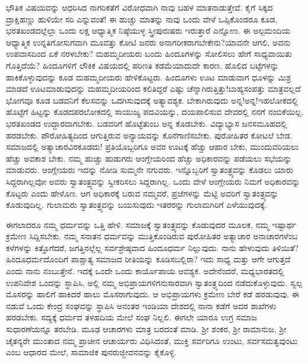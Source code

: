 ಭೌತಿಕ ವಿಷಯವನ್ನು ಆಧರಿಸಿದ ನಾಗರಿಕತೆಗೆ ವಿರೋಧವಾಗಿ ನಾವು ಬಹಳ ಮಾತನಾಡುತ್ತೇವೆ. ಕೈಗೆ ಸಿಕ್ಕದ ದ್ರಾಕ್ಷಿಹಣ್ಣು ಹುಳಿಯೇ ಸರಿ ಎನ್ನುವಂತೆ! ಈ ಹುಚ್ಚು ಮಾತನ್ನು ನಾವು ಒಂದು ವೇಳೆ ಒಪ್ಪಿಕೊಂಡರೂ ಕೂಡ, ಭರತಖಂಡದಲ್ಲೆಲ್ಲಾ ಒಂದು ಲಕ್ಷ ಆಧ್ಯಾತ್ಮಿಕ ನಿಷ್ಠೆಯುಳ್ಳ ಸ್ತ್ರೀ\enginline{-}ಪುರುಷರು ಇರುತ್ತಾರೆ ಎನ್ನೋಣ. ಈ ಅಲ್ಪಮಂದಿಯ ಆಧ್ಯಾತ್ಮಿಕ ಉನ್ನತಿಗೋಸುಗವಾಗಿ ಮೂವತ್ತು ಕೋಟಿ ಜನರು ಅನಾಗರೀಕರಾಗಬೇಕೇನು?ಯಾವನೇ ಆಗಲಿ, ಅವನು ಉಪವಾಸದಿಂದ ಏಕೆ ನರಳಬೇಕು? ಮಹಮ್ಮದೀಯರು ಬಂದು ಹಿಂದೂಗಳನ್ನು ಸೋಲಿಸಲು ಹೇಗೆ ಸಾಧ್ಯವಾಯಿತು ಗೊತ್ತಿದೆಯೆ? ಹಿಂದೂಗಳಿಗೆ ಲೌಕಿಕ ವಿಷಯದಲ್ಲಿ ಪರಿಣತಿ ಕಡಮೆಯಾದುದೇ ಕಾರಣ. ಹೊಲಿದ ಬಟ್ಟೆಗಳನ್ನು ಹಾಕಿಕೊಳ್ಳುವುದನ್ನು ಕೂಡ ಮಹಮ್ಮದೀಯರು ಹೇಳಿಕೊಟ್ಟರು. ಹಿಂದೂಗಳು ಊಟ ಮಾಡುವಾಗ ಧೂಳನ್ನು ಮಿಶ್ರ ಮಾಡದೆ ಊಟಮಾಡುವುದನ್ನು ಮಹಮ್ಮದೀಯರಿಂದ ಕಲಿತಿದ್ದರೆ ಎಷ್ಟು ಚೆನ್ನಾಗಿರುತ್ತಿತ್ತು!ಬಾಹ್ಯಸಂಪತ್ತು ಮಾತ್ರವಲ್ಲದೆ ಭೋಗವೂ ಕೂಡ ಬಡವನಿಗೆ ಕೆಲಸವನ್ನು ಒದಗಿಸುವುದಕ್ಕೆ ಅತ್ಯಾವಶ್ಯಕ. ಬೇಕಾಗಿರುವುದು ಅನ್ನ!ಅನ್ನ!ಇಹಲೋಕದಲ್ಲಿ ಹೊಟ್ಟೆಗೆ ಹಿಟ್ಟನ್ನು ಕೊಡದಪರಲೋಕದಲ್ಲಿ ಸಾಯುಜ್ಯ ಪದವಿಯನ್ನು, ದಯಪಾಲಿಸುವ ದೇವರಲ್ಲಿ ನನಗೆ ನಂಬಿಕೆಯಿಲ್ಲ. ಭರತಖಂಡದ ಉದ್ದಾರವಾಗಬೇಕು. ಬಡವರಿಗೆ ಹೊಟ್ಟೆತುಂಬ ಅನ್ನ ಕೊಡಬೇಕು. ವಿದ್ಯಾಭ್ಯಾಸ ಜನಸಮೂಹದಲ್ಲಿ ಹರಡಬೇಕು. ಪೌರೋಹಿತ್ಯದಿಂದ ಆಗುತ್ತಿರುವ ಅನ್ಯಾಯವನ್ನು ಕೊನೆಗಾಣಿಸಬೇಕು. ಪುರೋಹಿತರ ಕೋಟಲೆ ಬೇಡ. ಸಮಾಜದಲ್ಲಿ ಅತ್ಯಾಚಾರವಿರಕೂಡದು! ಪ್ರತಿಯೊಬ್ಬರಿಗೂ ಅವರ ಊಟಕ್ಕೆ ಹೆಚ್ಚು ಆಹಾರ ಬೇಕು, ಮುಂದುವರಿಯಲು ಹೆಚ್ಚು ಅವಕಾಶ ಬೇಕು. ನಮ್ಮ ಹುಚ್ಚು ಹುಡುಗರು ಆಂಗ್ಲೇಯರಿಂದ ಹೆಚ್ಚು ಅಧಿಕಾರವನ್ನು ಪಡೆಯಲು ಸಭೆಯನ್ನು ಮಾಡುವರು. ಆಂಗ್ಲೇಯರು ಇದನ್ನು ನೋಡಿ ಸುಮ್ಮನೇ ನಗುವರು. ಇನ್ನೊಬ್ಬರಿಗೆ ಸ್ವಾತಂತ್ರ್ಯವನ್ನು ಕೊಡಲು ಯಾರು ಸಿದ್ದರಾಗಿಲ್ಲವೋ ಅವರು ಸ್ವಾತಂತ್ರ್ಯವನ್ನು ಸ್ವೀಕರಿಸಲು ಸಿದ್ದರಾಗಿಲ್ಲ. ಒಂದು ವೇಳೆ ಆಂಗ್ಲೇಯರು ನಿಮಗೆ ಅಧಿಕಾರವನ್ನು ಕೊಟ್ಟರು ಎಂದು ಹೇಳೊಣ. ಆಗ ಅಧಿಕಾರಕ್ಕೆ ಬರುವ ನಮ್ಮವರೆ, ಪ್ರಜೆಗಳನ್ನು ಮೆಟ್ಟಿ ಅವರಿಗೆ ಸ್ವಾತಂತ್ರ್ಯವನ್ನು ಕೊಡುವುದಿಲ್ಲ. ಗುಲಾಮರು ಸ್ವಾತಂತ್ರ್ಯವನ್ನು ಬಯಸುವುದು ಇತರರನ್ನು ಗುಲಾಮಗಿರಿಗೆ ಎಳೆಯುವುದಕ್ಕೆ.

ಈಗಲಾದರೂ ನಮ್ಮ ಧರ್ಮವನ್ನು ಒತ್ತಿ ಹೇಳಿ. ಸಮಾಜಕ್ಕೆ ಸ್ವಾತಂತ್ರ್ಯವನ್ನು ಕೊಡುವುದರ ಮೂಲಕ, ನಮ್ಮ ಇಷ್ಟಾರ್ಥ ಕ್ರಮೇಣ ಸಿದ್ದಿಸಬೇಕು. ನಮ್ಮ ಸನಾತನ ಧರ್ಮವನ್ನು ಮುತ್ತಿಕೊಂಡಿರುವ ಪುರೋಹಿತರ ಅತ್ಯಾಚಾರ ಅನಾಚಾರಗಳೆಂಬ ಕಳೆಗಳನ್ನು ಕಿತ್ತೊಗೆದರೆ, ಜಗತ್ತಿನಲ್ಲೆಲ್ಲ ಸರ್ವಶ್ರೇಷ್ಠವಾದ ಹಿಂದೂಧರ್ಮ ನಿಲ್ಲುವುದು. ನಾನು ಹೇಳುವುದು ತಿಳಿಯಿತೆ?ಹಿಂದೂಧರ್ಮದೊಂದಿಗೆ ಪಾಶ್ಚಾತ್ಯ ಸಮಾಜದ ರೀತಿಯನ್ನು ಕೂಡಿಸಬಲ್ಲಿರಾ? ಇದು ಸಾಧ್ಯ ಮತ್ತು ಆಗೇ ಆಗುತ್ತದೆ ಎಂದು ನಾನು ನಂಬುತ್ತೇನೆ. ಇದಕ್ಕೆ ಒಂದೇ ಒಂದು ಕಾರ್ಯೊಪಾಯ ಆವಶ್ಯಕ. ಅದೇನೆಂದರೆ, ಮಧ್ಯಭಾರತದಲ್ಲಿ ಉಪನಿವೇಶ ಒಂದನ್ನು ಸ್ಥಾಪಿಸಿ, ಅಲ್ಲಿ ನಮ್ಮ ಅಭಿಪ್ರಾಯಗಳಿಗನುಸಾರವಾಗಿ ಸ್ವಾತಂತ್ರ್ಯದಿಂದ ನಡೆದುಕೊಳ್ಳುವುದು. ಸ್ವಲ್ಪ ಮೊಸರನ್ನು ಹಾಲಿಗೆ ಹಾಕಿದರೆ ಹಾಲು ಮೊಸರಾಗುವುದು. ಆ ಅಭಿಪ್ರಾಯಗಳು ಕ್ರಮೇಣ ಬೇರೆ ಕಡೆ ಹರಡುವುವು. ಈ ನಡುವೆ ಒಂದು ಕೇಂದ್ರ ಸಂಘವನ್ನು ಸ್ಥಾಪಿಸಿ ಅನಂತರ ಇಂಡಿಯಾ ದೇಶದಲ್ಲಿ ನಾನಾ ಕಡೆಗೆ ಅದರ ಶಾಖೆಗಳು ಹರಡಬೇಕು. ಸದ್ಯಕ್ಕೆ ಧರ್ಮದ ತಳಹದಿಯ ಮೇಲೆ ಸಂಘ ನಿಲ್ಲಲಿ. ಈಗಲೇ ಯಾರೂ ಉಗ್ರ ಸಮಾಜ ಸುಧಾರಣೆಯನ್ನೂ ತರಬೇಡಿ. ಮೂಢ ಆಚಾರಗಳು ಮಾತ್ರ ಬರದಂತೆ ಮಾಡಿ. ಶ‍್ರೀ ಶಂಕರ, ಶ‍್ರೀ ರಾಮಾನುಜ, ಶ‍್ರೀ ಚೈತನ್ಯರೇ ಮುಂತಾದ ನಮ್ಮ ಪ್ರಾಚೀನ ಆಚಾರ್ಯರು ವಿಧಿಸಿದಂತೆ, ಮುಕ್ತಿ ಸರ್ವರಿಗೂ ಉಂಟು, ಸರ್ವಸಮತ್ವವುಂಟು ಎಂಬ ಆಧಾರದ ಮೇಲೆ, ಸಾಮಾಜಿಕ ಪುನರುಜ್ಜೀವನವನ್ನು ಕೈಕೊಳ್ಳಿ.


